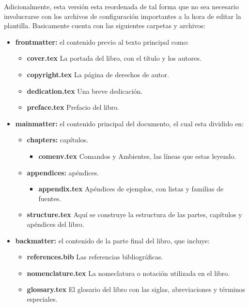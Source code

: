 Adicionalmente, esta versión esta reordenada de tal forma que no sea necesario involucrarse con los archivos de configuración importantes a la hora de editar la plantilla. Basicamente cuenta con las siguientes carpetas y archivos:
\begin{itemize}
    \item \textbf{frontmatter:} el contenido previo al texto principal como:
    \begin{itemize}
        \item \textbf{cover.tex} La portada del libro, con el título y los autores.
        \item \textbf{copyright.tex} La página de derechos de autor.
        \item \textbf{dedication.tex} Una breve dedicación.
        \item \textbf{preface.tex} Prefacio del libro.
    \end{itemize} 
    \item \textbf{mainmatter:} el contenido principal del documento, el cual esta dividido en:
    \begin{itemize}
        \item \textbf{chapters:} capítulos.
        \begin{itemize}
            \item \textbf{comenv.tex} Comandos y Ambientes, las líneas que estas leyendo. 
        \end{itemize}
        \item \textbf{appendices:} apéndices.
        \begin{itemize}
            \item \textbf{appendix.tex} Apéndices de ejemplos, con listas y familias de fuentes.
        \end{itemize}
        \item \textbf{structure.tex} Aquí se construye la estructura de las partes, capítulos y apéndices del libro. 
    \end{itemize}
    \item \textbf{backmatter:} el contenido de la parte final del libro, que incluye:
    \begin{itemize}
        \item \textbf{references.bib} Las referencias bibliográficas.
        \item \textbf{nomenclature.tex} La nomeclatura o notación utilizada en el libro.
        \item \textbf{glossary.tex} El glosario del libro con las siglas, abreviaciones y términos especiales. 

\end{itemize}
\end{itemize}
